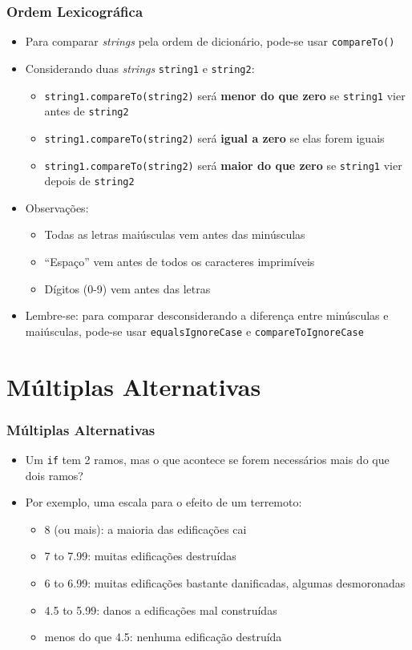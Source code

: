 \documentclass[xcolor={dvipsnames,table},aspectratio=169]{beamer}
\begin{document}
\begin{frame}\frametitle{Ordem Lexicográfica}
\begin{itemize}
	\item Para comparar \emph{strings} pela ordem de dicionário, pode-se usar \texttt{compareTo()}
	\item Considerando duas \emph{strings} \texttt{string1} e \texttt{string2}:
	\begin{itemize}
		\item \texttt{string1.compareTo(string2)} será \textbf{menor do que zero} se \texttt{string1} vier antes de \texttt{string2}
		\item \texttt{string1.compareTo(string2)} será \textbf{igual a zero} se elas forem iguais
		\item \texttt{string1.compareTo(string2)} será \textbf{maior do que zero} se \texttt{string1} vier depois de \texttt{string2}
	\end{itemize}
	\item Observações:
	\begin{itemize}
		\item Todas as letras maiúsculas vem antes das minúsculas
		\item ``Espaço'' vem antes de todos os caracteres imprimíveis
		\item Dígitos (0-9) vem antes das letras
	\end{itemize}
	\item Lembre-se: para comparar desconsiderando a diferença entre minúsculas e maiúsculas, pode-se usar \texttt{equalsIgnoreCase} e \texttt{compareToIgnoreCase}
\end{itemize}
\end{frame}

\section{Múltiplas Alternativas}

\begin{frame}\frametitle{Múltiplas Alternativas}
\begin{itemize}
	\item Um \texttt{if} tem 2 ramos, mas o que acontece se forem necessários mais do que dois ramos?
	\item Por exemplo, uma escala para o efeito de um terremoto:
	\begin{itemize}
		\item 8 (ou mais): a maioria das edificações cai
		\item 7 to 7.99: muitas edificações destruídas
		\item 6 to 6.99: muitas edificações bastante danificadas, algumas desmoronadas
		\item 4.5 to 5.99: danos a edificações mal construídas
		\item menos do que 4.5: nenhuma edificação destruída
	\end{itemize}
\end{itemize}
\end{frame}
\end{document}
